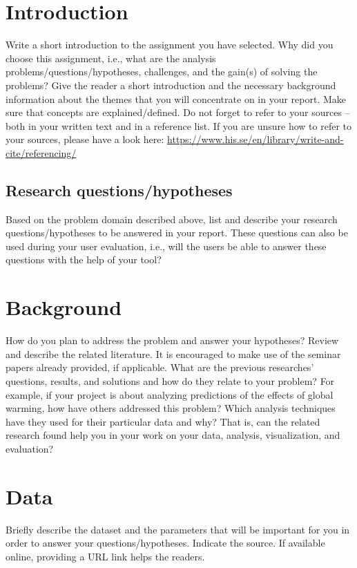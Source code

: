 \section{Introduction}
\label{chap:introduction}

Write a short introduction to the assignment you have selected. Why did you choose this assignment, i.e., what are the analysis problems/questions/hypotheses, challenges, and the gain(s) of solving the problems? Give the reader a short introduction and the necessary background information about the themes that you will concentrate on in your report. Make sure that concepts are explained/defined. Do not forget to refer to your sources – both in your written text and in a reference list. If you are unsure how to refer to your sources, please have a look here: \url{https://www.his.se/en/library/write-and-cite/referencing/}

\subsection{Research questions/hypotheses}
\label{sec:quesstion}
Based on the problem domain described above, list and describe your research questions/hypotheses to be answered in your report. These questions can also be used during your user evaluation, i.e., will the users be able to answer these questions with the help of your tool? 

\section{Background}
\label{chap:background}
How do you plan to address the problem and answer your hypotheses? Review and describe the related literature. It is encouraged to make use of the seminar papers already provided, if applicable. What are the previous researches’ questions, results, and solutions and how do they relate to your problem? For example, if your project is about analyzing predictions of the effects of global warming, how have others addressed this problem? Which analysis techniques have they used for their particular data and why? That is, can the related research found help you in your work on your data, analysis, visualization, and evaluation?


\section{Data}
\label{chap:data}
Briefly describe the dataset and the parameters that will be important for you in order to answer your questions/hypotheses. Indicate the source. If available online, providing a URL link helps the readers.

